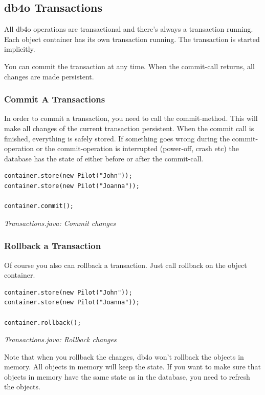 \subsection{db4o Transactions}
\label{ref:basics-acid-and-transactions-db4o-tx-basics}

All db4o operations are transactional and there's always a transaction running. Each object container has its own transaction running. The transaction is started implicitly.

You can commit the transaction at any time. When the commit-call returns, all changes are made persistent.

\subsubsection*{Commit A Transactions}

In order to commit a transaction, you need to call the commit-method. This will make all changes of the current transaction persistent. When the commit call is finished, everything is safely stored. If something goes wrong during the commit-operation or the commit-operation is interrupted (power-off, crash etc) the database has the state of either before or after the commit-call.

\begin{lstlisting}
container.store(new Pilot("John"));
container.store(new Pilot("Joanna"));

container.commit();
\end{lstlisting}

{\small\itshape Transactions.java: Commit changes\par}
\medskip

\subsubsection*{Rollback a Transaction}

Of course you also can rollback a transaction. Just call rollback on the object container.

\begin{lstlisting}
container.store(new Pilot("John"));
container.store(new Pilot("Joanna"));

container.rollback();
\end{lstlisting}

{\small\itshape Transactions.java: Rollback changes\par}
\medskip

Note that when you rollback the changes, db4o won't rollback the objects in memory. All objects in memory will keep the state. If you want to make sure that objects in memory have the same state as in the database, you need to refresh the objects.

